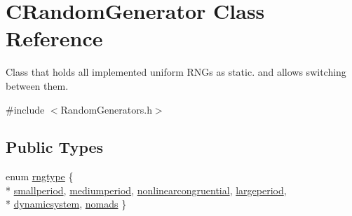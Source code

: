 \hypertarget{class_c_random_generator}{\section{C\-Random\-Generator Class Reference}
\label{class_c_random_generator}
}


Class that holds all implemented uniform R\-N\-Gs as static. and allows switching between them.  




{\ttfamily \#include $<$Random\-Generators.\-h$>$}

\subsection*{Public Types}
\begin{DoxyCompactItemize}
\item 
enum \hyperlink{class_c_random_generator_a50566d64b5ada7e335fc3acd52d958f6}{rngtype} \{ \\*
\hyperlink{class_c_random_generator_a50566d64b5ada7e335fc3acd52d958f6a06b91d80b64d47fe43771c58f9d74436}{smallperiod}, 
\hyperlink{class_c_random_generator_a50566d64b5ada7e335fc3acd52d958f6a90d3097298c61cac2a5d4ea06bb4a572}{mediumperiod}, 
\hyperlink{class_c_random_generator_a50566d64b5ada7e335fc3acd52d958f6a56fb79354c6f775d7b5a27d629469706}{nonlinearcongruential}, 
\hyperlink{class_c_random_generator_a50566d64b5ada7e335fc3acd52d958f6a1db4f25ec3ffd309b5b0e1b3d08f744c}{largeperiod}, 
\\*
\hyperlink{class_c_random_generator_a50566d64b5ada7e335fc3acd52d958f6a2915c3490d8305158735b8b279f24cd6}{dynamicsystem}, 
\hyperlink{class_c_random_generator_a50566d64b5ada7e335fc3acd52d958f6a7132ff3b3042018da5ef62edb3d5ae20}{nomads}
 \}
\end{DoxyCompactItemize}
